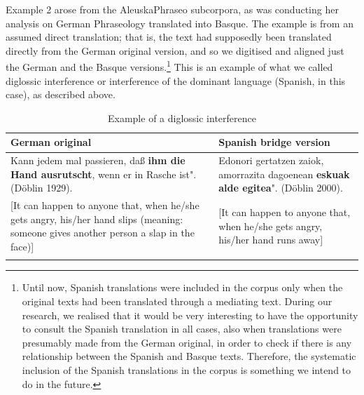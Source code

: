\documentclass[output=paper]{LSP/langsci}
\begin{document}
Example 2 arose from the AleuskaPhraseo subcorpora, as \citet{Sanz2014} was conducting her analysis on German Phraseology translated into Basque. The example is from an assumed direct translation; that is, the text had supposedly been translated directly from the German original version, and so we digitised and aligned just the German and the Basque versions.\footnote{Until now, Spanish translations were included in the corpus only when the original texts had been translated through a mediating text. During our research, we realised that it would be very interesting to have the opportunity to consult the Spanish translation in all cases, also when translations were presumably made from the German original, in order to check if there is any relationship between the Spanish and Basque texts. Therefore, the systematic inclusion of the Spanish translations in the corpus is something we intend to do in the future.} This is an example of what we called diglossic interference or interference of the dominant language (Spanish, in this case), as described above.

\begin{table}[t]
     \centering
     \begin{tabularx}{\textwidth}{XX}
     \lsptoprule
German original    & Spanish bridge version  \\ 
\midrule
Kann jedem mal passieren, daß \textbf{ihm die Hand ausrutscht}, wenn er in Rasche ist".	(Döblin 1929).   &  Edonori gertatzen zaiok, amorrazita dagoenean \textbf{eskuak alde egitea}". (Döblin 2000).  \\ 
{[}It can happen to anyone that, when he/she gets angry, his/her hand slips (meaning: someone gives another person a slap in the face){]}  & {[}It can happen to anyone that, when he/she gets angry, his/her hand runs away{]}  \\

\lspbottomrule
\end{tabularx}

 \caption{Example of a diglossic interference}
     \label{3.4}
\end{table}     
   
\end{document}
